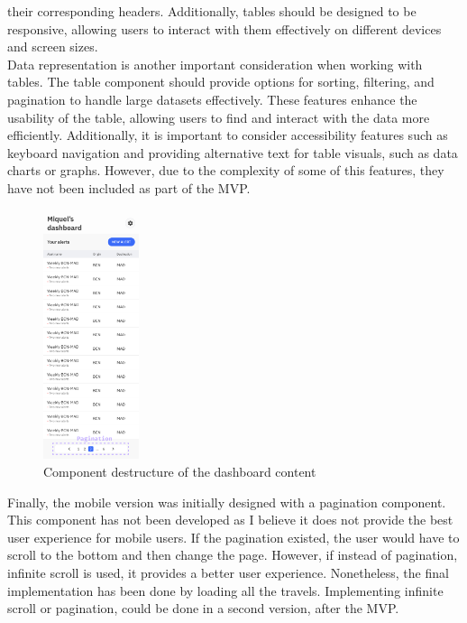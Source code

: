 \documentclass[./memory.tex]{subfiles}
\begin{document}
their corresponding headers. Additionally, tables should be designed to be
responsive, allowing users to interact with them effectively on different
devices and screen sizes.
\\
Data representation is another important consideration when working with tables.
The table component should provide options for sorting, filtering, and
pagination to handle large datasets effectively. These features enhance the
usability of the table, allowing users to find and interact with the data more
efficiently. Additionally, it is important to consider accessibility features
such as keyboard navigation and providing alternative text for table visuals,
such as data charts or graphs. However, due to the complexity of some of this
features, they have not been included as part of the MVP.
\begin{figure}[H]
	\centering
	\includegraphics[width=0.25\textwidth]{./assets/designs/dashboard-sm-pagination.png}
	\caption{Component destructure of the dashboard content}
\end{figure}
Finally, the mobile version was initially designed with a pagination component.
This component has not been developed as I believe it does not provide the best
user experience for mobile users. If the pagination existed, the user would have
to scroll to the bottom and then change the page. However, if instead of
pagination, infinite scroll is used, it provides a better user experience.
Nonetheless, the final implementation has been done by loading all the travels.
Implementing infinite scroll or pagination, could be done in a second version,
after the MVP.
\end{document}
